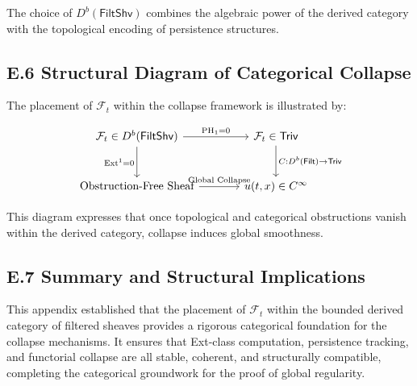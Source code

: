 \documentclass[11pt]{article}
\begin{document}
\begin{table}[h!]
\centering
{}
\caption{Comparison of Categorical Settings for \( \mathcal{F}_t \)}
\end{table}


The choice of \( D^b(\mathsf{FiltShv}) \) combines the algebraic power of the derived category with the topological encoding of persistence structures.

\subsection*{E.6 Structural Diagram of Categorical Collapse}

The placement of \( \mathcal{F}_t \) within the collapse framework is illustrated by:

\[
\begin{tikzcd}[row sep=large, column sep=large]
\mathcal{F}_t \in D^b(\mathsf{FiltShv})
  \arrow[r, "{\mathrm{PH}_1 = 0}"]
  \arrow[d, "{\mathrm{Ext}^1 = 0}"']
& \mathcal{F}_t \in \mathsf{Triv}
  \arrow[d, "{C : D^b(\mathsf{Filt}) \to \mathsf{Triv}}"] \\
\text{Obstruction-Free Sheaf}
  \arrow[r, "{\text{Global Collapse}}"]
& u(t, x) \in C^\infty
\end{tikzcd}
\]

This diagram expresses that once topological and categorical obstructions vanish within the derived category, collapse induces global smoothness.

\subsection*{E.7 Summary and Structural Implications}

This appendix established that the placement of \( \mathcal{F}_t \) within the bounded derived category of filtered sheaves provides a rigorous categorical foundation for the collapse mechanisms.  
It ensures that Ext-class computation, persistence tracking, and functorial collapse are all stable, coherent, and structurally compatible, completing the categorical groundwork for the proof of global regularity.
\end{document}
